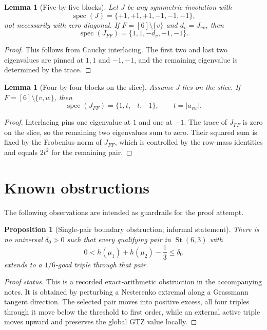 \documentclass[11pt]{article}
\numberwithin{equation}{section}
\newtheorem{lemma}[theorem]{Lemma}
\newtheorem{proposition}[theorem]{Proposition}
\theoremstyle{definition}
\newcommand{\St}{\operatorname{St}}
\newcommand{\spec}{\operatorname{spec}}
\begin{document}
\begin{lemma}[Five-by-five blocks]
Let $J$ be any symmetric involution with
\[
  \spec(J)=\{+1,+1,+1,-1,-1,-1\},
\]
not necessarily with zero diagonal.  If $F=[6]\setminus\{v\}$ and $d_v=J_{vv}$,
then
\[
  \spec(J_{FF})=\{1,1,-d_v,-1,-1\}.
\]
\end{lemma}

\begin{proof}
This follows from Cauchy interlacing.  The first two and last two eigenvalues
are pinned at $1,1$ and $-1,-1$, and the remaining eigenvalue is determined by
the trace.
\end{proof}

\begin{lemma}[Four-by-four blocks on the slice]
Assume $J$ lies on the slice.  If $F=[6]\setminus\{v,w\}$, then
\[
  \spec(J_{FF})=\{1,t,-t,-1\},\qquad t=|a_{vw}|.
\]
\end{lemma}

\begin{proof}
Interlacing pins one eigenvalue at $1$ and one at $-1$.  The trace of $J_{FF}$
is zero on the slice, so the remaining two eigenvalues sum to zero.  Their
squared sum is fixed by the Frobenius norm of $J_{FF}$, which is controlled by
the row-mass identities and equals $2t^2$ for the remaining pair.
\end{proof}

\section{Known obstructions}

The following observations are intended as guardrails for the proof attempt.

\begin{proposition}[Single-pair boundary obstruction; informal statement]\label{prop:boundary}
There is no universal $\delta_0>0$ such that every qualifying pair in
$\St(6,3)$ with
\[
  0<h(\mu_1)+h(\mu_2)-\frac13\le\delta_0
\]
extends to a $1/6$-good triple through that pair.
\end{proposition}

\begin{proof}[Proof status]
This is a recorded exact-arithmetic obstruction in the accompanying notes.  It
is obtained by perturbing a Nesterenko extremal along a Grassmann tangent
direction.  The selected pair moves into positive excess, all four triples
through it move below the threshold to first order, while an external active
triple moves upward and preserves the global GTZ value locally.
\end{proof}
\end{document}

